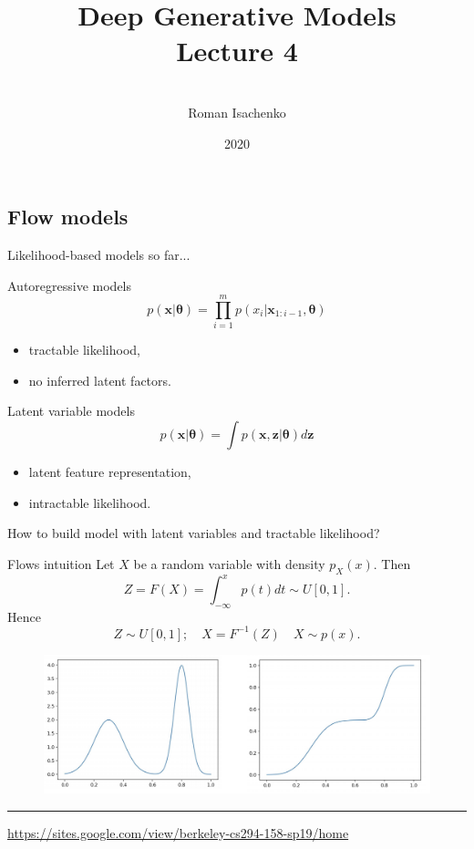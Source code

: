 \documentclass{beamer}
\title[\hbox to 56mm{Deep Generative Models  \hfill\insertframenumber\,/\,\inserttotalframenumber}]
{Deep Generative Models \\ Lecture 4}
\author[Roman Isachenko]{\\Roman Isachenko}
\institute[MIPT]{Moscow Institute of Physics and Technology \\
}
\date{2020}
\newcommand{\bx}{\mathbf{x}}
\newcommand{\bz}{\mathbf{z}}
\newcommand{\btheta}{\boldsymbol{\theta}}
\begin{document}
\begin{frame}
\titlepage
\end{frame}
\subsection{Flow models}
\begin{frame}{Likelihood-based models so far...}
	\begin{minipage}[t]{0.5\columnwidth}
		\begin{block}{Autoregressive models}
			\vspace{-0.5cm}
			\[
			p(\bx|\btheta) = \prod_{i=1}^m p(x_i | \bx_{1:i - 1}, \btheta)
			\]
			\vspace{-0.2cm}
			\begin{itemize}
				\item tractable likelihood, 
				\item no inferred latent factors.
			\end{itemize}
		\end{block}
	\end{minipage}%
	\begin{minipage}[t]{0.5\columnwidth}
		\begin{block}{Latent variable models}
			\[
			p(\bx| \btheta) = \int p(\bx, \bz | \btheta) d \bz
			\]
			\begin{itemize}
				\item latent feature representation, 
				\item intractable likelihood.
			\end{itemize}
		\end{block}
	\end{minipage}
	
	\vspace{1cm } 
	How to build model with latent variables and tractable likelihood?
\end{frame}
\begin{frame}{Flows intuition}
	Let $X$ be a random variable with density $p_X(x)$. Then
	\[
	Z = F(X) = \int_{-\infty}^x p(t)dt \sim U[0, 1].
	\]
	Hence
	\[
	Z \sim U[0, 1]; \quad X = F^{-1}(Z) \quad X \sim p(x).
	\]
	\begin{figure}
		\includegraphics[width=\linewidth]{figs/flows_1d}
	\end{figure}
	
	\vfill
	\hrule\medskip
	{\scriptsize \href{https://sites.google.com/view/berkeley-cs294-158-sp19/home}{https://sites.google.com/view/berkeley-cs294-158-sp19/home}}
	
\end{frame}
\end{document}
